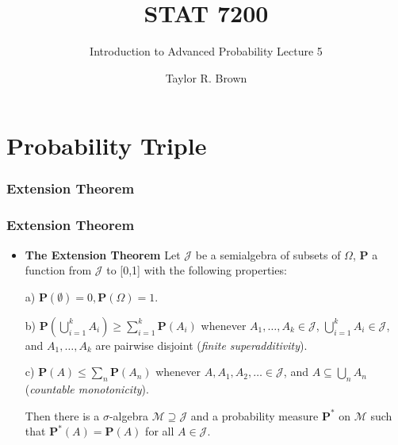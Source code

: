 \documentclass[handout]{beamer}
\title{STAT 7200}
\subtitle{Introduction to Advanced Probability \newline Lecture 5}
\author{Taylor R. Brown}
\institute{}
\date{}
\newcommand{\BP}{\mathbf{P}}
\begin{document}
\frame{\titlepage}

\section[Outline]{}


\section{Probability Triple}

\subsubsection{Extension Theorem}
\frame
{
  \frametitle{Extension Theorem}

   \begin{itemize}

             \item<1-> [] \begin{Theorem} \textbf{The Extension Theorem}  Let $\mathcal{J}$ be a semialgebra of subsets of $\Omega$,  $\mathbf{P}$ a function from $\mathcal{J}$  to [0,1] with the following properties:
             \newline
             
             a) $\mathbf{P} (\emptyset)=0, \mathbf{P}(\Omega)=1$.
                 \newline
         
             b) $\BP(\bigcup_{i=1}^k A_i)\geq \sum_{i=1}^k \BP(A_i)$ whenever $A_1,\ldots,A_k \in\mathcal{J}$, $\bigcup_{i=1}^k A_i  \in\mathcal{J}$, and $A_1,\ldots,A_k$ are pairwise disjoint (\textit{finite superadditivity}).
                   \newline
       
             c) $\BP(A)\leq \sum_{n} \BP(A_n)$ whenever $A,A_1,A_2,\ldots \in\mathcal{J}$, and $A\subseteq \bigcup_{n} A_n$ (\textit{countable monotonicity}).               
             \newline
             
             Then there is a $\sigma$-algebra $\mathcal{M} \supseteq \mathcal{J}$ and a probability measure $\BP^*$ on $\mathcal{M}$ such that $\BP^*(A)=\BP(A)$ for all $A\in \mathcal{J}$.
             \end{Theorem}    
       
                
                 \end{itemize}
}
\end{document}
